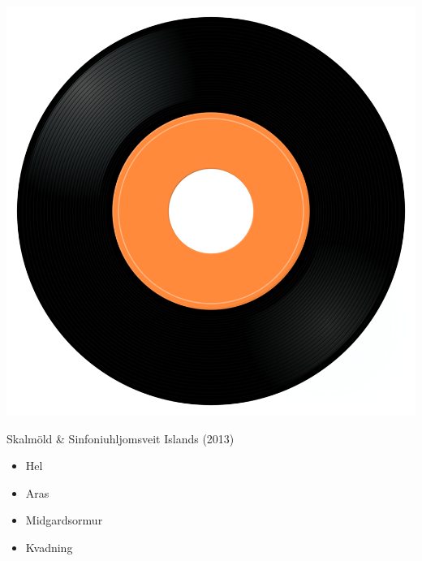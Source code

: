 \begin{minipage}[t]{0.25\textwidth}
\captionsetup{type=figure}
\includegraphics[width=\textwidth]{Images/cover.png}
\caption*{Skalmöld \& Sinfoniuhljomsveit Islands (2013)}
\end{minipage}
\begin{minipage}[t]{0.25\textwidth}\vspace{0pt}
\begin{itemize}[nosep,leftmargin=1em,labelwidth=*,align=left]
	\setlength{\itemsep}{0pt}
	\item Hel
	\item Aras
	\item Midgardsormur
	\item Kvadning
\end{itemize}
\end{minipage}
